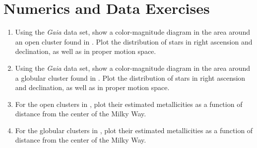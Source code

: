 \section{Numerics and Data Exercises}

\begin{enumerate}
\item Using the {\it Gaia} data set, show a color-magnitude
diagram in the area around an open cluster found
in \citet{dias02a}. Plot the distribution of stars in right ascension
and declination, as well as in proper motion space.
\item Using the {\it Gaia} data set, show a color-magnitude
diagram in the area around a globular cluster found
in \citet{harris96a}. Plot the distribution of stars in right
ascension and declination, as well as in proper motion space.
\item For the open clusters in \citet{dias02a}, plot their estimated
metallicities as a function of distance from the center of the Milky
Way.
\item For the globular clusters in \citet{harris96a}, plot their estimated
metallicities as a function of distance from the center of the Milky
Way.
\end{enumerate}


  
